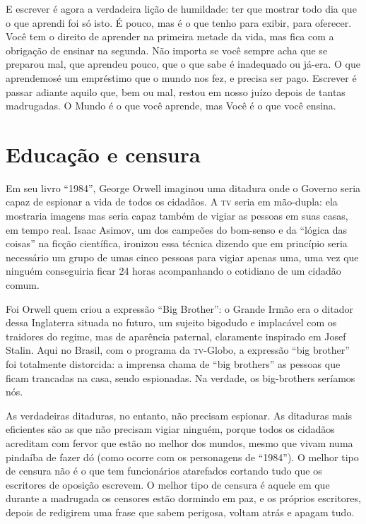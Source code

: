 E escrever é agora a verdadeira lição de humildade: ter que mostrar
todo dia que o que aprendi foi só isto. É pouco, mas é o que tenho
para exibir, para oferecer. Você tem o direito de aprender na
primeira metade da vida, mas fica com a obrigação de ensinar na
segunda. Não importa se você sempre acha que se preparou mal, que
aprendeu pouco, que o que sabe é inadequado ou já-era. O que
aprendemosé um empréstimo que o mundo nos fez, e precisa ser pago.
Escrever é passar adiante aquilo que, bem ou mal, restou em nosso
juízo depois de tantas madrugadas. O Mundo é o que você aprende, mas
Você é o que você ensina.

\chapter{Educação e censura}

Em seu livro “1984”, George Orwell imaginou uma ditadura onde o
Governo seria capaz de espionar a vida de todos os cidadãos. A \textsc{tv}
seria em mão-dupla: ela mostraria imagens mas seria capaz também de
vigiar as pessoas em suas casas, em tempo real. Isaac Asimov, um dos
campeões do bom-senso e da “lógica das coisas” na ficção científica,
ironizou essa técnica dizendo que em princípio seria necessário um
grupo de umas cinco pessoas para vigiar apenas uma, uma vez que
ninguém conseguiria ficar 24 horas acompanhando o cotidiano de um
cidadão comum.

Foi Orwell quem criou a expressão “Big Brother”: o Grande Irmão era o
ditador dessa Inglaterra situada no futuro, um sujeito bigodudo e
implacável com os traidores do regime, mas de aparência paternal,
claramente inspirado em Josef Stalin. Aqui no Brasil, com o programa
da \textsc{tv}-Globo, a expressão “big brother” foi totalmente distorcida: a
imprensa chama de “big brothers” as pessoas que ficam trancadas na
casa, sendo espionadas. Na verdade, os big-brothers seríamos nós.

As verdadeiras ditaduras, no entanto, não precisam espionar. As
ditaduras mais eficientes são as que não precisam vigiar ninguém,
porque todos os cidadãos acreditam com fervor que estão no melhor dos
mundos, mesmo que vivam numa pindaíba de fazer dó (como ocorre com os
personagens de “1984”). O melhor tipo de censura não é o que tem
funcionários atarefados cortando tudo que os escritores de oposição
escrevem. O melhor tipo de censura é aquele em que durante a
madrugada os censores estão dormindo em paz, e os próprios
escritores, depois de redigirem uma frase que sabem perigosa, voltam
atrás e apagam tudo.

